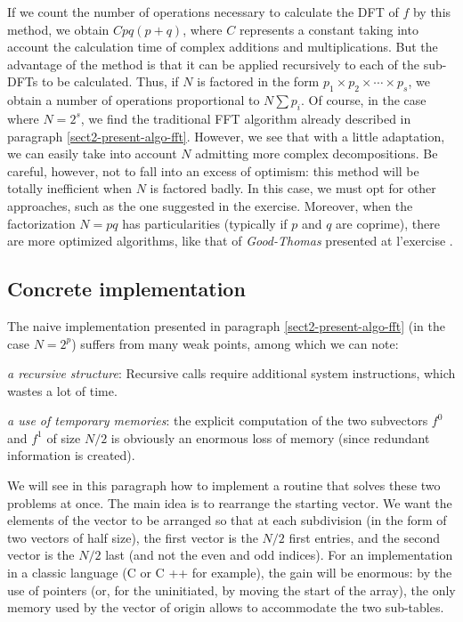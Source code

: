  
If we count the number of operations necessary to calculate the DFT of $ f $ by this method, we obtain $ C pq (p + q) $, where $ C $ represents a constant taking into account the calculation time of complex additions and multiplications. But the advantage of the method is that it can be applied recursively to each of the sub-DFTs to be calculated. Thus, if $N$ is factored in the form $ p_1 \times p_2 \times \cdots \times p_s $, we obtain a number of operations proportional to $ N \sum{p_i} $. Of course, in the case where $ N = 2^s $, we find the traditional FFT algorithm already described in paragraph \ref{sect2-present-algo-fft}. However, we see that with a little adaptation, we can easily take into account $N$ admitting more complex decompositions. Be careful, however, not to fall into an excess of optimism: this method will be totally inefficient when $N$ is factored badly. In this case, we must opt for other approaches, such as the one suggested in the  exercise. Moreover, when the factorization $ N = pq $ has particularities (typically if $ p $ and $ q $ are coprime), there are more optimized algorithms, like that of \textit{Good-Thomas} presented at l'exercise .
\subsection{Concrete implementation}
\label{sect2-impl-concrete} 
 
 
The naive implementation presented in paragraph \ref{sect2-present-algo-fft} (in the case $ N = 2^p $) suffers from many weak points, among which we can note: \begin{rs}
\item \textit{a recursive structure}: Recursive calls require additional system instructions, which wastes a lot of time.
\item \textit{a use of temporary memories}: the explicit computation of the two subvectors $ f^0 $ and $ f^1 $ of size $ N / 2 $ is obviously an enormous loss of memory (since redundant information is created).
\end{rs} We will see in this paragraph how to implement a routine that solves these two problems at once. The main idea is to rearrange the starting vector. We want the elements of the vector to be arranged so that at each subdivision (in the form of two vectors of half size), the first vector is the $ N / 2 $ first entries, and the second vector is the $ N / 2 $ last (and not the even and odd indices). For an implementation in a classic language (C or C ++ for example), the gain will be enormous: by the use of pointers (or, for the uninitiated, by moving the start of the array), the only memory used by the vector of origin allows to accommodate the two sub-tables.
 

